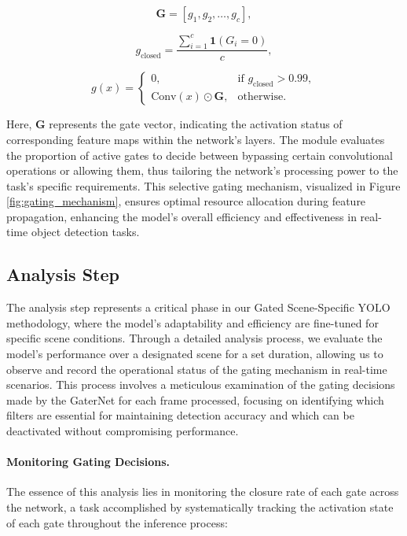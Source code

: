 \begin{equation}
\mathbf{G} = [g_1, g_2, \ldots, g_c], \label{eq:G_vector}
\end{equation}

\begin{equation}
g_{\text{closed}} = \frac{\sum_{i=1}^{c} \mathbf{1}(G_i = 0)}{c}, \label{eq:g_closed}
\end{equation}

\begin{equation}
g(x) = 
\begin{cases} 
0, & \text{if } g_{\text{closed}} > 0.99, \\
\text{Conv}(x) \odot \mathbf{G}, & \text{otherwise}.
\end{cases} \label{eq:conditional_gating}
\end{equation}

Here, \(\mathbf{G}\) represents the gate vector, indicating the activation status of corresponding feature maps within the network's layers. The module evaluates the proportion of active gates to decide between bypassing certain convolutional operations or allowing them, thus tailoring the network's processing power to the task's specific requirements. This selective gating mechanism, visualized in Figure \ref{fig:gating_mechanism}, ensures optimal resource allocation during feature propagation, enhancing the model's overall efficiency and effectiveness in real-time object detection tasks.

\subsection{Analysis Step}

The analysis step represents a critical phase in our Gated Scene-Specific YOLO methodology, where the model's adaptability and efficiency are fine-tuned for specific scene conditions. Through a detailed analysis process, we evaluate the model's performance over a designated scene for a set duration, allowing us to observe and record the operational status of the gating mechanism in real-time scenarios. This process involves a meticulous examination of the gating decisions made by the GaterNet for each frame processed, focusing on identifying which filters are essential for maintaining detection accuracy and which can be deactivated without compromising performance.

\paragraph{Monitoring Gating Decisions.} The essence of this analysis lies in monitoring the closure rate of each gate across the network, a task accomplished by systematically tracking the activation state of each gate throughout the inference process:

